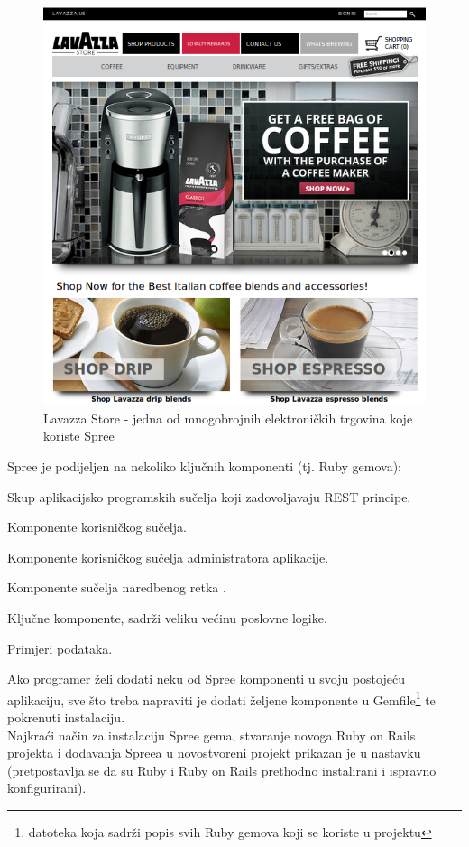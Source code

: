 \begin{figure}[H]
    \centering
    \includegraphics[scale=0.60]{pictures/spree_lavazza}
    \caption{Lavazza Store - jedna od mnogobrojnih elektroničkih trgovina koje koriste Spree}
    \label{pic:spreeLavazza}
\end{figure}

Spree je podijeljen na nekoliko ključnih komponenti (tj. Ruby gemova):
\begin{description}[style=nextline]
    \item[spree\_api] Skup aplikacijsko programskih sučelja koji zadovoljavaju REST  principe.
    \item[spree\_frontend] Komponente korisničkog sučelja.
    \item[spree\_backend] Komponente korisničkog sučelja administratora aplikacije.
    \item[spree\_cmd] Komponente sučelja naredbenog retka .
    \item[spree\_core] Ključne komponente, sadrži veliku većinu poslovne logike.
    \item[spree\_sample] Primjeri podataka.
\end{description}

Ako programer želi dodati neku od Spree komponenti u svoju postojeću aplikaciju, sve što treba napraviti je dodati željene komponente u Gemfile\footnote{datoteka koja sadrži popis svih Ruby gemova koji se koriste u projektu} te pokrenuti instalaciju.
\\
Najkraći način za instalaciju Spree gema, stvaranje novoga Ruby on Rails projekta i dodavanja Spreea u novostvoreni projekt prikazan je u nastavku (pretpostavlja se da su Ruby i Ruby on Rails prethodno instalirani i ispravno konfigurirani).

